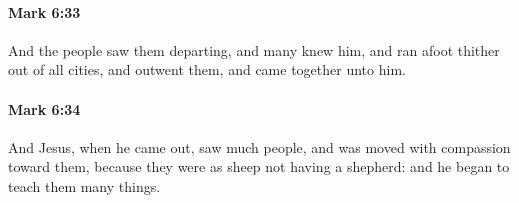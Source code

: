 		\paragraph{Mark 6:33} %
			\label{MARK-6-33}

			And the people saw them departing, and many knew him, and ran afoot thither out of all cities, and outwent them, and came together unto him.

			\begin{framed}
			\scriptsize
				\begin{compactdesc}
					\item[SBLG] 
				\end{compactdesc}
			\end{framed}

		\paragraph{Mark 6:34} %
			\label{MARK-6-34}

			And Jesus, when he came out, saw much people, and was moved with compassion toward them, because they were as sheep not having a shepherd: and he began to teach them many things.

